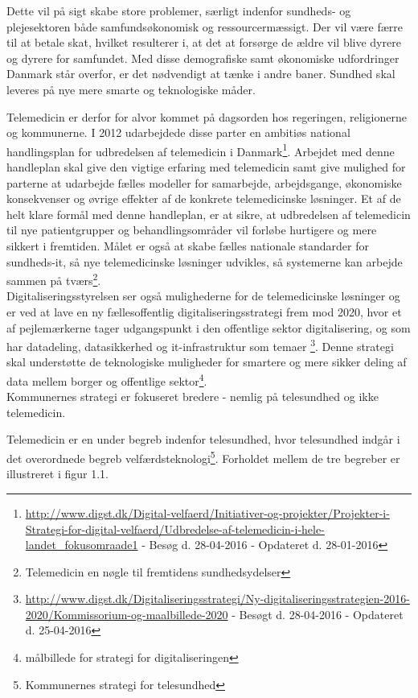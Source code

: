  Dette vil på sigt skabe store problemer, særligt indenfor sundheds- og plejesektoren både samfundsøkonomisk og ressourcermæssigt. Der vil være færre til at betale skat, hvilket resulterer i, at det at forsørge de ældre vil blive dyrere og dyrere for samfundet. 
Med disse demografiske samt økonomiske udfordringer Danmark står overfor, er det nødvendigt at tænke i andre baner. Sundhed skal leveres på nye mere smarte og teknologiske måder.        

Telemedicin er derfor for alvor kommet på dagsorden hos regeringen, religionerne og kommunerne. I 2012 udarbejdede disse parter en ambitiøs national handlingsplan for udbredelsen af telemedicin i Danmark\footnote{\url{http://www.digst.dk/Digital-velfaerd/Initiativer-og-projekter/Projekter-i-Strategi-for-digital-velfaerd/Udbredelse-af-telemedicin-i-hele-landet_fokusomraade1} - Besøg d. 28-04-2016 - Opdateret d. 28-01-2016}. Arbejdet med denne handleplan skal give den vigtige erfaring med telemedicin samt give mulighed for parterne at udarbejde fælles modeller for samarbejde, arbejdsgange, økonomiske konsekvenser og øvrige effekter af de konkrete telemedicinske løsninger. Et af de helt klare formål med denne handleplan, er at sikre, at udbredelsen af telemedicin til nye patientgrupper og behandlingsområder vil forløbe hurtigere og mere sikkert i fremtiden. Målet er også at skabe fælles nationale standarder for sundheds-it, så nye telemedicinske løsninger udvikles, så systemerne kan arbejde sammen på tværs\footnote{Telemedicin en nøgle til fremtidens sundhedsydelser}. \\
Digitaliseringsstyrelsen ser også mulighederne for de telemedicinske løsninger og er ved at lave en ny fællesoffentlig digitaliseringsstrategi frem mod 2020, hvor et af pejlemærkerne tager udgangspunkt i den offentlige sektor digitalisering, og som har datadeling, datasikkerhed og it-infrastruktur som temaer \footnote{\url{http://www.digst.dk/Digitaliseringsstrategi/Ny-digitaliseringsstrategien-2016-2020/Kommissorium-og-maalbillede-2020} - Besøgt d. 28-04-2016 - Opdateret d. 25-04-2016}. Denne strategi skal understøtte de teknologiske muligheder for smartere og mere sikker deling af data mellem borger og offentlige sektor\footnote{målbillede for strategi for digitaliseringen}.\\
Kommunernes strategi er fokuseret bredere - nemlig på telesundhed og ikke telemedicin.

Telemedicin er en under begreb indenfor telesundhed, hvor telesundhed indgår i det overordnede begreb velfærdsteknologi\footnote{Kommunernes strategi for telesundhed}. Forholdet mellem de tre begreber er illustreret i figur 1.1. 

